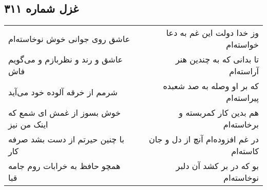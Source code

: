 \begin{center}
\section*{غزل شماره ۳۱۱}
\label{sec:sh311}
\begin{longtable}{l p{0.5cm} r}
عاشق روی جوانی خوش نوخاسته‌ام
&&
وز خدا دولت این غم به دعا خواسته‌ام
\\
عاشق و رند و نظربازم و می‌گویم فاش
&&
تا بدانی که به چندین هنر آراسته‌ام
\\
شرمم از خرقه آلوده خود می‌آید
&&
که بر او وصله به صد شعبده پیراسته‌ام
\\
خوش بسوز از غمش ای شمع که اینک من نیز
&&
هم بدین کار کمربسته و برخاسته‌ام
\\
با چنین حیرتم از دست بشد صرفه کار
&&
در غم افزوده‌ام آنچ از دل و جان کاسته‌ام
\\
همچو حافظ به خرابات روم جامه قبا
&&
بو که در بر کشد آن دلبر نوخاسته‌ام
\\
\end{longtable}
\end{center}
